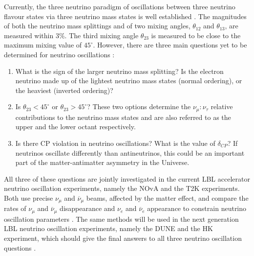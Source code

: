 Currently, the three neutrino paradigm of oscillations between three neutrino flavour states via three neutrino mass states is well established \cite{PDG.pdf, NuOscGlobalFit2020.pdf}. The magnitudes of both the neutrino mass splittings and of two mixing angles, $\theta_{12}$ and $\theta_{13}$, are measured within $3\%$. The third mixing angle $\theta_{23}$ is measured to be close to the maximum mixing value of $45^{\circ}$. However, there are three main questions yet to be determined for neutrino oscillations \cite{SnowmassNeutrinoFrontierReport.pdf}:
\begin{enumerate}
\item What is the sign of the larger neutrino mass splitting? Is the electron neutrino made up of the lightest neutrino mass states (normal ordering), or the heaviest (inverted ordering)?
\item Is $\theta_{23}<45^{\circ}$ or $\theta_{23}>45^{\circ}$? These two options determine the $\nu_\mu : \nu_\tau$ relative contributions to the neutrino mass states and are also referred to as the upper and the lower octant respectively.
\item Is there \gls{CP} violation in neutrino oscillations? What is the value of $\delta_{CP}$? If neutrinos oscillate differently than antineutrinos, this could be an important part of the matter-antimatter asymmetry in the Universe.
\end{enumerate}
All three of these questions are jointly investigated in the current \gls{LBL} accelerator neutrino oscillation experiments, namely the \gls{NOvA} \cite{NOvAResults2021.pdf} and the \gls{T2K} \cite{T2KOscResults2023.pdf} experiments. Both use precise $\nu_\mu$ and $\overline{\nu}_\mu$ beams, affected by the matter effect, and compare the rates of
$\nu_\mu$ and $\overline{\nu}_\mu$ disappearance and $\nu_e$ and $\overline{\nu}_e$ appearance to constrain neutrino oscillation parameters \cite{SnowmassNeutrinoFrontierReport.pdf}. The same methods will be used in the next generation \gls{LBL} neutrino oscillation experiments, namely the \gls{DUNE} \cite{IntroductionToDUNE2020.pdf} and the \gls{HK} \cite{HyperKTDR2018.pdf} experiment, which should give the final answers to all three neutrino oscillation questions \cite{SnowmassNeutrinoFrontierReport.pdf}.
 


